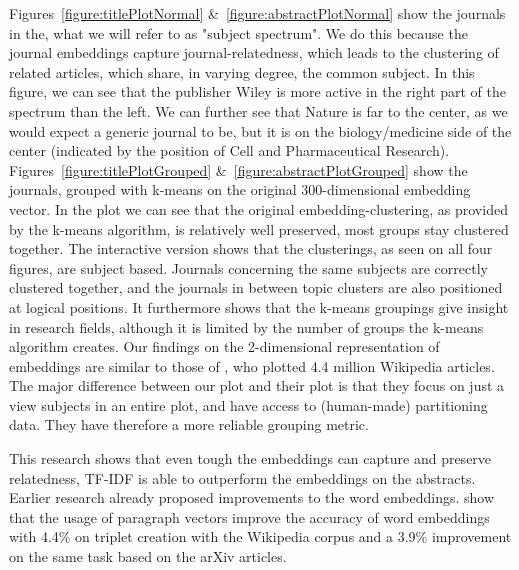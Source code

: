 \documentclass[../../Thesis.tex]{subfiles}
\begin{document}
\begin{jumpin}
Figures~\ref{figure:titlePlotNormal} \&~\ref{figure:abstractPlotNormal} show the journals in the, what we will refer to as "subject spectrum". We do this because the journal embeddings capture journal-relatedness, which leads to the clustering of related articles, which share, in varying degree, the common subject. In this figure, we can see that the publisher Wiley is more active in the right part of the spectrum than the left. We can further see that Nature is far to the center, as we would expect a generic journal to be, but it is on the biology/medicine side of the center (indicated by the position of Cell and Pharmaceutical Research).\\
Figures~\ref{figure:titlePlotGrouped} \&~\ref{figure:abstractPlotGrouped} show the journals, grouped with k-means on the original 300-dimensional embedding vector. In the plot we can see that the original embedding-clustering, as provided by the k-means algorithm, is relatively well preserved, most groups stay clustered together. 
The interactive version shows that the clusterings, as seen on all four figures, are subject based. Journals concerning the same subjects are correctly clustered together, and the journals in between topic clusters are also positioned at logical positions. It furthermore shows that the k-means groupings give insight in research fields, although it is limited by the number of groups the k-means algorithm creates. Our findings on the 2-dimensional representation of embeddings are similar to those of \citet{dai2015document}, who plotted 4.4 million Wikipedia articles. The major difference between our plot and their plot is that they focus on just a view subjects in an entire plot, and have access to (human-made) partitioning data. They have therefore a more reliable grouping metric.
\end{jumpin}
This research shows that even tough the embeddings can capture and preserve relatedness, TF-IDF is able to outperform the embeddings on the abstracts. Earlier research already proposed improvements to the word embeddings. \citet{dai2015document} show that the usage of paragraph vectors improve the accuracy of word embeddings with 4.4\% on triplet creation with the Wikipedia corpus and a 3.9\% improvement on the same task based on the arXiv articles.\\
\end{document}
